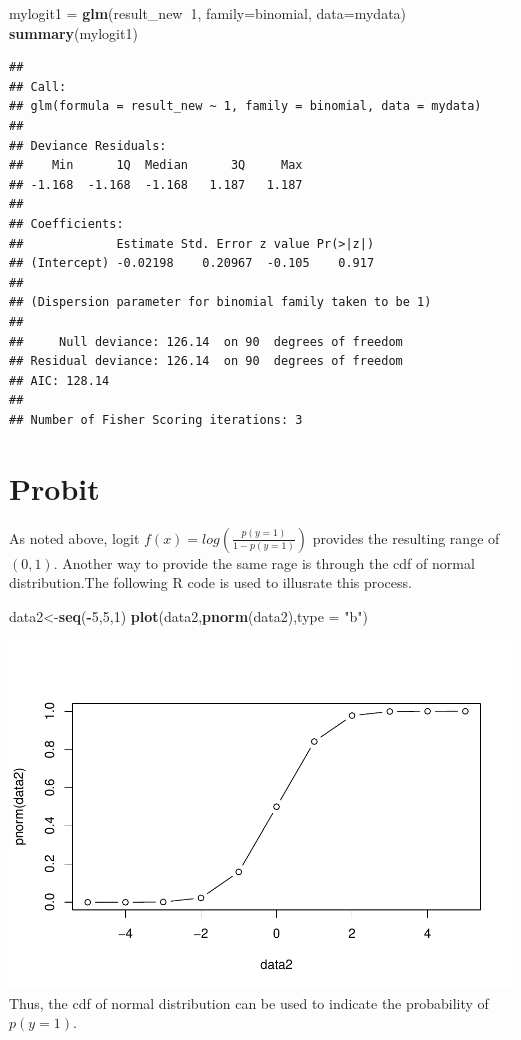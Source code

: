 \documentclass[]{book}
\newenvironment{Shaded}{\begin{snugshade}}{\end{snugshade}}
\newcommand{\DataTypeTok}[1]{\textcolor[rgb]{0.13,0.29,0.53}{#1}}
\newcommand{\DecValTok}[1]{\textcolor[rgb]{0.00,0.00,0.81}{#1}}
\newcommand{\KeywordTok}[1]{\textcolor[rgb]{0.13,0.29,0.53}{\textbf{#1}}}
\newcommand{\NormalTok}[1]{#1}
\newcommand{\OperatorTok}[1]{\textcolor[rgb]{0.81,0.36,0.00}{\textbf{#1}}}
\newcommand{\StringTok}[1]{\textcolor[rgb]{0.31,0.60,0.02}{#1}}
\begin{document}
\begin{Shaded}
\begin{Highlighting}[]
\NormalTok{mylogit1 =}\StringTok{ }\KeywordTok{glm}\NormalTok{(result_new}\OperatorTok{~}\DecValTok{1}\NormalTok{, }\DataTypeTok{family=}\NormalTok{binomial, }\DataTypeTok{data=}\NormalTok{mydata)}
\KeywordTok{summary}\NormalTok{(mylogit1)}
\end{Highlighting}
\end{Shaded}

\begin{verbatim}
## 
## Call:
## glm(formula = result_new ~ 1, family = binomial, data = mydata)
## 
## Deviance Residuals: 
##    Min      1Q  Median      3Q     Max  
## -1.168  -1.168  -1.168   1.187   1.187  
## 
## Coefficients:
##             Estimate Std. Error z value Pr(>|z|)
## (Intercept) -0.02198    0.20967  -0.105    0.917
## 
## (Dispersion parameter for binomial family taken to be 1)
## 
##     Null deviance: 126.14  on 90  degrees of freedom
## Residual deviance: 126.14  on 90  degrees of freedom
## AIC: 128.14
## 
## Number of Fisher Scoring iterations: 3
\end{verbatim}

\hypertarget{probit}{%
\section{Probit}\label{probit}}

As noted above, logit \(f(x)=log(\frac{p(y=1)}{1-p(y=1)})\) provides the resulting range of \((0,1)\). Another way to provide the same rage is through the cdf of normal distribution.The following R code is used to illusrate this process.

\begin{Shaded}
\begin{Highlighting}[]
\NormalTok{data2<-}\KeywordTok{seq}\NormalTok{(}\OperatorTok{-}\DecValTok{5}\NormalTok{,}\DecValTok{5}\NormalTok{,}\DecValTok{1}\NormalTok{)}
\KeywordTok{plot}\NormalTok{(data2,}\KeywordTok{pnorm}\NormalTok{(data2),}\DataTypeTok{type =} \StringTok{"b"}\NormalTok{)}
\end{Highlighting}
\end{Shaded}

\includegraphics{bookdown-demo_files/figure-latex/unnamed-chunk-3-1.pdf}
Thus, the cdf of normal distribution can be used to indicate the probability of \(p(y=1)\).
\end{document}
